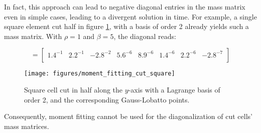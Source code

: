 In fact, this approach can lead to negative diagonal entries in the mass matrix even in simple cases, leading to a divergent solution in time. For example, a single square element cut half in figure \ref{fig:moment_fitting_cut_square}, with a basis of order 2 already yields such a mass matrix. With $\rho=1$ and $\beta=5$, the diagonal reads:

\begin{equation}
		[M_{ii}^e] =
		\begin{bmatrix}
			1.4^{-1} &
			2.2^{-1} &
			-2.8^{-2} &
			5.6^{-6} &
			8.9^{-6} &
			1.4^{-6} &
			2.2^{-6} &
			-2.8^{-7} \\
		\end{bmatrix}
\end{equation}

\begin{figure}[h]
	\centering
	\texttt{[image: figures/moment\_fitting\_cut\_square]}
	\caption{Square cell cut in half along the $y$-axis with a Lagrange basis of order 2, and the corresponding Gauss-Lobatto points.}
	\label{fig:moment_fitting_cut_square}
\end{figure}

Consequently, moment fitting cannot be used for the diagonalization of cut cells' mass matrices.